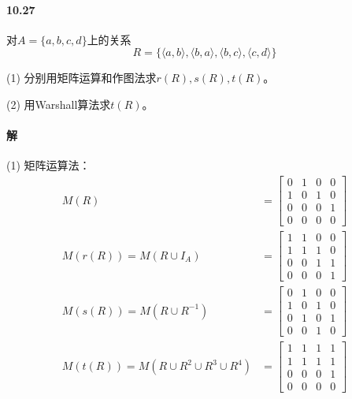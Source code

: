 \documentclass[UTF8]{ctexart}
\begin{document}
\paragraph{10.27} \label{10.27}
    对$A=\{a,b,c,d\}$上的关系
    $$R = \{ \langle a,b \rangle , \langle b,a \rangle , \langle b,c \rangle , \langle c,d \rangle \} $$
    
    (1) 分别用矩阵运算和作图法求$r(R),s(R),t(R)$。

    (2) 用Warshall算法求$t(R)$。

\paragraph{解}

    (1) 矩阵运算法：
    \begin{align*}
        M(R) & = \begin{bmatrix}
            0 & 1 & 0 & 0 \\
            1 & 0 & 1 & 0 \\
            0 & 0 & 0 & 1 \\
            0 & 0 & 0 & 0
        \end{bmatrix} \\
        M(r(R)) = M(R \cup I_A) & = \begin{bmatrix}
            1 & 1 & 0 & 0 \\
            1 & 1 & 1 & 0 \\
            0 & 0 & 1 & 1 \\
            0 & 0 & 0 & 1
        \end{bmatrix} \\
        M(s(R)) = M(R \cup R^{-1}) & = \begin{bmatrix}
            0 & 1 & 0 & 0 \\
            1 & 0 & 1 & 0 \\
            0 & 1 & 0 & 1 \\
            0 & 0 & 1 & 0
        \end{bmatrix} \\
        M(t(R)) = M(R \cup R^2 \cup R^3 \cup R^4) & = \begin{bmatrix}
            1 & 1 & 1 & 1 \\
            1 & 1 & 1 & 1 \\
            0 & 0 & 0 & 1 \\
            0 & 0 & 0 & 0
        \end{bmatrix}
    \end{align*}
    
\end{document}
